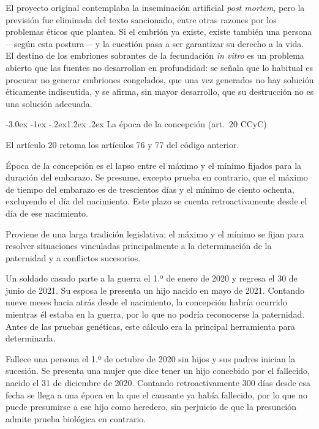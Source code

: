 \documentclass[12pt,oneside]{book}
\makeatletter
\renewcommand\section{\@startsection{section}{1}{\z@}%
  {-3.0ex \@plus -1ex \@minus -.2ex}{1.2ex \@plus .2ex}%
  {\normalfont\large\bfseries\color{acento}}}
\makeatother
\begin{document}
El proyecto original contemplaba la inseminación artificial \textit{post mortem}, pero la previsión fue eliminada del texto sancionado, entre otras razones por los problemas éticos que plantea. Si el embrión ya existe, existe también una persona ---según esta postura--- y la cuestión pasa a ser garantizar su derecho a la vida. El destino de los embriones sobrantes de la fecundación \textit{in vitro} es un problema abierto que las fuentes no desarrollan en profundidad: se señala que lo habitual es procurar no generar embriones congelados, que una vez generados no hay solución éticamente indiscutida, y se afirma, sin mayor desarrollo, que su destrucción no es una solución adecuada.

\section{La época de la concepción (art.~20 CCyC)}

El artículo 20 retoma los artículos 76 y 77 del código anterior.

\begin{regla}
Época de la concepción es el lapso entre el máximo y el mínimo fijados para la duración del embarazo. Se presume, excepto prueba en contrario, que el máximo de tiempo del embarazo es de trescientos días y el mínimo de ciento ochenta, excluyendo el día del nacimiento. Este plazo se cuenta retroactivamente desde el día de ese nacimiento.
\end{regla}

Proviene de una larga tradición legislativa; el máximo y el mínimo se fijan para resolver situaciones vinculadas principalmente a la determinación de la paternidad y a conflictos sucesorios.

\begin{ejemplo}
Un soldado casado parte a la guerra el 1.º de enero de 2020 y regresa el 30 de junio de 2021. Su esposa le presenta un hijo nacido en mayo de 2021. Contando nueve meses hacia atrás desde el nacimiento, la concepción habría ocurrido mientras él estaba en la guerra, por lo que no podría reconocerse la paternidad. Antes de las pruebas genéticas, este cálculo era la principal herramienta para determinarla.
\end{ejemplo}

\begin{ejemplo}
Fallece una persona el 1.º de octubre de 2020 sin hijos y sus padres inician la sucesión. Se presenta una mujer que dice tener un hijo concebido por el fallecido, nacido el 31 de diciembre de 2020. Contando retroactivamente 300 días desde esa fecha se llega a una época en la que el causante ya había fallecido, por lo que no puede presumirse a ese hijo como heredero, sin perjuicio de que la presunción admite prueba biológica en contrario.
\end{ejemplo}
\end{document}
